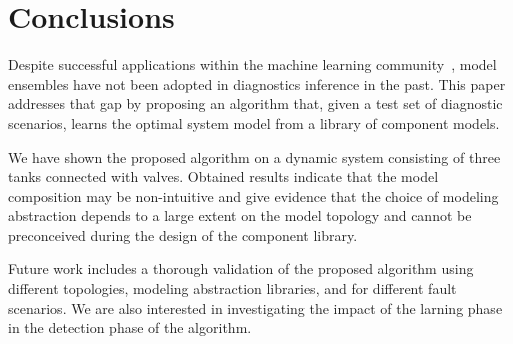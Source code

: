 \section{Conclusions}\label{sec:conclusions}
%
Despite successful applications within the machine learning community~\citep{brown2010ensemble,dietterich2000ensemble},
model ensembles have not been adopted in diagnostics inference in the past. This paper addresses that gap by proposing
an algorithm that, given a test set of diagnostic scenarios, learns the optimal system model from a library of component
models.

We have shown the proposed algorithm on a dynamic system consisting of three tanks connected with valves. Obtained results
indicate that the model composition may be non-intuitive and give evidence that the choice of modeling abstraction depends
to a large extent on the model topology and cannot be preconceived during the design of the component library.

Future work includes a thorough validation of the proposed algorithm using different topologies, modeling abstraction
libraries, and for different fault scenarios. We are also interested in investigating the impact of the larning phase
in the detection phase of the algorithm.
